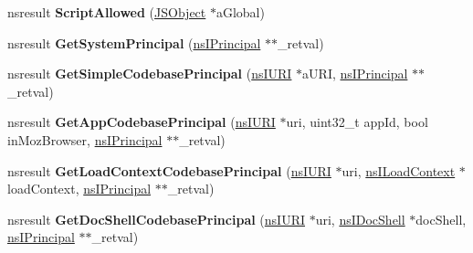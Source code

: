 \begin{DoxyCompactItemize}
\item 
\mbox{\label{interfacens_i_script_security_manager_a9fea9b7c754334bdc60b2b9fb45f7f7c}} 
nsresult {\bfseries Script\+Allowed} (\hyperlink{interfacevoid}{J\+S\+Object} $\ast$a\+Global)
\item 
\mbox{\label{interfacens_i_script_security_manager_a3bf26743e4862ef666a3df7405fffd39}} 
nsresult {\bfseries Get\+System\+Principal} (\hyperlink{interfacens_i_supports}{ns\+I\+Principal} $\ast$$\ast$\+\_\+retval)
\item 
\mbox{\label{interfacens_i_script_security_manager_aa7ff729fc8fa429b55e72af3f66ecfbd}} 
nsresult {\bfseries Get\+Simple\+Codebase\+Principal} (\hyperlink{interfacens_i_u_r_i}{ns\+I\+U\+RI} $\ast$a\+U\+RI, \hyperlink{interfacens_i_supports}{ns\+I\+Principal} $\ast$$\ast$\+\_\+retval)
\item 
\mbox{\label{interfacens_i_script_security_manager_a491013932ea5e485633147ac29f3ae88}} 
nsresult {\bfseries Get\+App\+Codebase\+Principal} (\hyperlink{interfacens_i_u_r_i}{ns\+I\+U\+RI} $\ast$uri, uint32\+\_\+t app\+Id, bool in\+Moz\+Browser, \hyperlink{interfacens_i_supports}{ns\+I\+Principal} $\ast$$\ast$\+\_\+retval)
\item 
\mbox{\label{interfacens_i_script_security_manager_a1776c150f0f0180d1a9d1012bdadf509}} 
nsresult {\bfseries Get\+Load\+Context\+Codebase\+Principal} (\hyperlink{interfacens_i_u_r_i}{ns\+I\+U\+RI} $\ast$uri, \hyperlink{interfacens_i_supports}{ns\+I\+Load\+Context} $\ast$load\+Context, \hyperlink{interfacens_i_supports}{ns\+I\+Principal} $\ast$$\ast$\+\_\+retval)
\item 
\mbox{\label{interfacens_i_script_security_manager_a316b851168e4efa04cdc1f8584d850f3}} 
nsresult {\bfseries Get\+Doc\+Shell\+Codebase\+Principal} (\hyperlink{interfacens_i_u_r_i}{ns\+I\+U\+RI} $\ast$uri, \hyperlink{interfacens_i_doc_shell}{ns\+I\+Doc\+Shell} $\ast$doc\+Shell, \hyperlink{interfacens_i_supports}{ns\+I\+Principal} $\ast$$\ast$\+\_\+retval)
\item 
\mbox{\label{interfacens_i_script_security_manager_a7d4ce55595bbfa15172668039b2c23c5}} 
$$
\end{DoxyCompactItemize}
